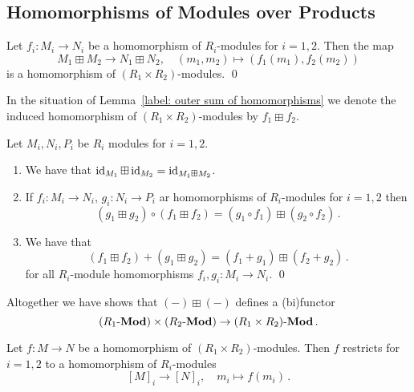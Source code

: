 \subsection{Homomorphisms of Modules over Products}


\begin{lemma}
  \label{label: outer sum of homomorphisms}
  Let $f_i \colon M_i \to N_i$ be a homomorphism of $R_i$-modules for $i = 1, 2$.
  Then the map
  \[
            M_1 \boxplus M_2
    \to     N_1 \boxplus N_2,
    \quad   (m_1, m_2)
    \mapsto (f_1(m_1), f_2(m_2))
  \]
  is a homomorphism of $(R_1 \times R_2)$-modules.
  \qed
\end{lemma}


\begin{definition}
  In the situation of Lemma~\ref{label: outer sum of homomorphisms} we denote the induced homomorphism of $(R_1 \times R_2)$-modules by $f_1 \boxplus f_2$.
\end{definition}


\begin{lemma}
  \label{lemma: boxplus is functorial}
  Let $M_i, N_i, P_i$ be $R_i$ modules for $i = 1, 2$.
  \begin{enumerate}
    \item
      We have that $\operatorname{id}_{M_1} \boxplus \operatorname{id}_{M_2} = \operatorname{id}_{M_1 \boxplus M_2}$.
    \item
      If $f_i \colon M_i \to N_i$, $g_i \colon N_i \to P_i$ ar homomorphisms of $R_i$-modules for $i = 1, 2$ then
      \[
          (g_1 \boxplus g_2) \circ (f_1 \boxplus f_2)
        = (g_1 \circ f_1) \boxplus (g_2 \circ f_2) \,.
      \]
    \item
      We have that
      \[
          (f_1 \boxplus f_2) + (g_1 \boxplus g_2)
        = (f_1 + g_1) \boxplus (f_2 + g_2) \,.
      \]
      for all $R_i$-module homomorphisms $f_i, g_i \colon M_i \to N_i$. 
    \qed
  \end{enumerate}
\end{lemma}




\begin{remark}
  \label{remark: functor out of product}
  Altogether we have shows that $(-) \boxplus (-)$ defines a (bi)functor
  \[
        (R_1\text{-}\mathbf{Mod}) \times (R_2\text{-}\mathbf{Mod})
    \to (R_1 \times R_2)\text{-}\mathbf{Mod} \,.
  \]
\end{remark}


\begin{lemma}
  \label{lemma: restrictions of homomorphisms}
  Let $f \colon M \to N$ be a homomorphism of $(R_1 \times R_2)$-modules.
  Then $f$ restricts for $i = 1, 2$ to a homomorphism of $R_i$-modules
  \[
            [M]_i
    \to     [N]_i,
    \quad   m_i
    \mapsto f(m_i) \,.
  \]
  
\end{lemma}


